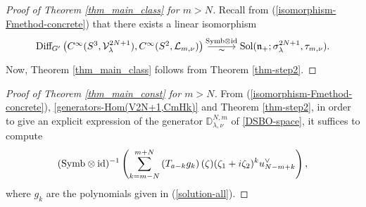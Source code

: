 \documentclass[12pt, pdflatex, a4paper]{article}
\theoremstyle{plain}
\theoremstyle{definition}
\def\Diff{\text{\normalfont{Diff}}}
\def\D{\mathbb{D}}
\def\id{\text{\normalfont{id}}}
\def\L{\mathcal{L}}
\def\n{\mathfrak{n}}
\def\Sol{\text{\normalfont{Sol}}}
\def\Symb{\text{\normalfont{Symb}}}
\def\V{\mathcal{V}}
\begin{document}
\begin{proof}[Proof of Theorem \ref{thm_main_class} for $m > N$]
Recall from (\ref{isomorphism-Fmethod-concrete}) that there exists a linear isomorphism
\begin{equation*}
\begin{tikzcd}[column sep = 1cm]
\Diff_{G^\prime}\left(C^\infty(S^3, \V_\lambda^{2N+1}), C^\infty(S^2, \L_{m,\nu})\right) \arrow[r, "\displaystyle{_{\Symb \otimes \id}}", "\thicksim"'] & \Sol(\n_+; \sigma_\lambda^{2N+1}, \tau_{m, \nu}).
\end{tikzcd}
\end{equation*}
Now, Theorem \ref{thm_main_class} follows from Theorem \ref{thm-step2}.
\end{proof}

\begin{proof}[Proof of Theorem \ref{thm_main_const} for $m>N$]
From (\ref{isomorphism-Fmethod-concrete}), \eqref{generators-Hom(V2N+1,CmHk)} and Theorem \ref{thm-step2}, in order to give an explicit expression of the generator $\D_{\lambda, \nu}^{N, m}$ of \eqref{DSBO-space}, it suffices to compute 
\begin{equation}\label{proof-generator}
(\Symb \otimes \id)^{-1} \left( \sum_{k = m-N}^{m+N}\left(T_{a-k}g_k\right)(\zeta)(\zeta_1 + i\zeta_2)^{k}u_{N-m+k}^\vee \right),
\end{equation}
where $g_k$ are the polynomials given in (\ref{solution-all}).



\end{proof}
\end{document}

